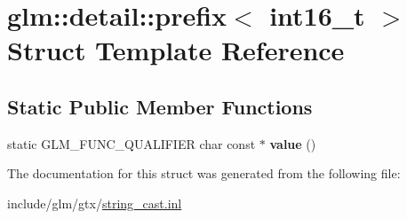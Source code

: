 \hypertarget{structglm_1_1detail_1_1prefix_3_01int16__t_01_4}{}\section{glm\+:\+:detail\+:\+:prefix$<$ int16\+\_\+t $>$ Struct Template Reference}
\label{structglm_1_1detail_1_1prefix_3_01int16__t_01_4}
\subsection*{Static Public Member Functions}
\begin{DoxyCompactItemize}
\item 
\mbox{\label{structglm_1_1detail_1_1prefix_3_01int16__t_01_4_a0ccbfcd8a1f5a2b777dbc43bad141bb6}} 
static G\+L\+M\+\_\+\+F\+U\+N\+C\+\_\+\+Q\+U\+A\+L\+I\+F\+I\+ER char const  $\ast$ {\bfseries value} ()
\end{DoxyCompactItemize}


The documentation for this struct was generated from the following file\+:\begin{DoxyCompactItemize}
\item 
include/glm/gtx/\hyperlink{string__cast_8inl}{string\+\_\+cast.\+inl}\end{DoxyCompactItemize}
